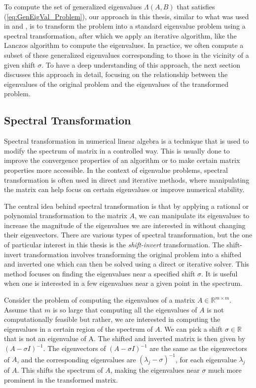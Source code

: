 To compute the set of generalized eigenvalues $\Lambda(A, B)$ that satisfies (\ref{eq:GenEigVal_Problem}), our approach in this thesis, similar to what was used in \cite{stewart2024spectraltransformationdensesymmetric} and \cite{Ericsson1980TheST}, is to transform the problem into a standard eigenvalue problem using a spectral transformation, after which we apply an iterative algorithm, like the Lanczos algorithm to compute the eigenvalues. In practice, we often compute a subset of these generalized eigenvalues corresponding to those in the vicinity of a given shift $\sigma$. To have a deep understanding of this approach, the next section discusses this approach in detail, focusing on the relationship between the eigenvalues of the original problem and the eigenvalues of the transformed problem.

\subsection{Spectral Transformation}\label{sec:SpectralTransformationDefinition}
Spectral transformation in numerical linear algebra is a technique that is used to modify the spectrum of matrix in a controlled way. This is usually done to improve the convergence properties of an algorithm or to make certain matrix properties more accessible. In the context of eigenvalue problems, spectral transformation is often used in direct and iterative methods, where manipulating the matrix can help focus on certain eigenvalues or improve numerical stability.

The central idea behind spectral transformation is that by applying a rational or polynomial transformation to the matrix $A$, we can manipulate its eigenvalues to increase the magnitude of the eigenvalues we are interested in without changing their eigenvectors. There are various types of spectral transformation, but the one of particular interest in this thesis is the \textit{shift-invert} transformation. The shift-invert transformation involves transforming the original problem into a shifted and inverted one which can then be solved using a direct or iterative solver. This method focuses on finding the eigenvalues near a specified shift $\sigma$. It is useful when one is interested in a few eigenvalues near a given point in the spectrum.

Consider the problem of computing the eigenvalues of a matrix $A \in \mathbb{R}^{m \times m}$. Assume that $m$ is so large that computing all the eigenvalues of $A$ is not computationally feasible but rather, we are interested in computing the eigenvalues in a certain region of the spectrum of $A$. We can pick a shift $\sigma \in \mathbb{R}$ that is not an eigenvalue of A. The shifted and inverted matrix is then given by $(A - \sigma I)^{-1}$. The eigenvectors of $(A - \sigma I)^{-1}$ are the same as the eigenvectors of $A$, and the corresponding eigenvalues are $(\lambda_j - \sigma)^{-1}$, for each eigenvalue $\lambda_j$ of $A$. This shifts the spectrum of $A$, making the eigenvalues near $\sigma$ much more prominent in the transformed matrix.

